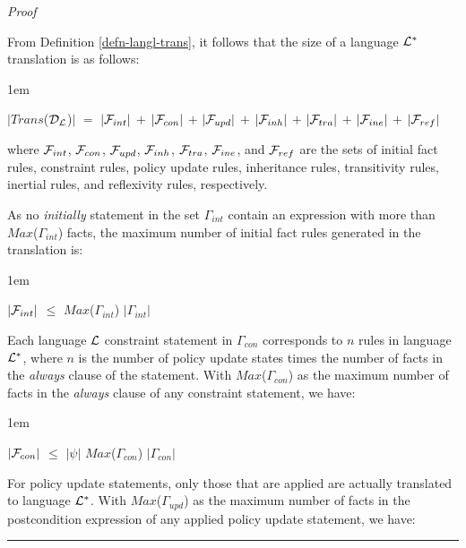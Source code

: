\documentclass[11pt]{report}
\newenvironment{vproof}
{
  \noindent
  {\em Proof}\hspace{0.5em}
}
{

  \noindent
  \rule{0.5em}{0.5em}
}
\newenvironment{vquote}
{
  \begin{list}{}{\leftmargin 1em}\item[]
}
{
  \end{list}
}
\begin{document}
        \begin{vproof}
          From Definition \ref{defn-langl-trans}, it follows that the size of
          a language ${\cal L}^{*}$ translation is as follows:

          \begin{vquote}
            $|$$Trans$(${\cal D_{L}}$)$|$ $=$
              $|{\cal F}_{int}|$ $+$
              $|{\cal F}_{con}|$ $+$
              $|{\cal F}_{upd}|$ $+$
              $|{\cal F}_{inh}|$ $+$
              $|{\cal F}_{tra}|$ $+$
              $|{\cal F}_{ine}|$ $+$
              $|{\cal F}_{ref}|$
          \end{vquote}

          \noindent
          where ${\cal F}_{int}$, ${\cal F}_{con}$, ${\cal F}_{upd}$,
          ${\cal F}_{inh}$, ${\cal F}_{tra}$, ${\cal F}_{ine}$, and
          ${\cal F}_{ref}$ are the sets of initial fact rules, constraint
          rules, policy update rules, inheritance rules, transitivity rules,
          inertial rules, and reflexivity rules, respectively.

          As no {\em initially} statement in the set $\Gamma_{int}$ contain
          an expression with more than $Max$($\Gamma_{int}$) facts, the
          maximum number of initial fact rules generated in the translation
          is:

          \begin{vquote}
            $|{\cal F}_{int}|$ $\leq$
              $Max$($\Gamma_{int}$) $|\Gamma_{int}|$
          \end{vquote}

          Each language ${\cal L}$ constraint statement in $\Gamma_{con}$
          corresponds to $n$ rules in language ${\cal L}^{*}$, where $n$ is
          the number of policy update states times the number of facts in the
          {\em always} clause of the statement. With $Max$($\Gamma_{con}$) as
          the maximum number of facts in the {\em always} clause of any
          constraint statement, we have:

          \begin{vquote}
            $|{\cal F}_{con}|$ $\leq$
              $|\psi|$ $Max$($\Gamma_{con}$) $|\Gamma_{con}|$
          \end{vquote}

          For policy update statements, only those that are applied are
          actually translated to language ${\cal L}^{*}$. With
          $Max$($\Gamma_{upd}$) as the maximum number of facts in the
          postcondition expression of any applied policy update statement, we
          have:


\end{vproof}
\end{document}
